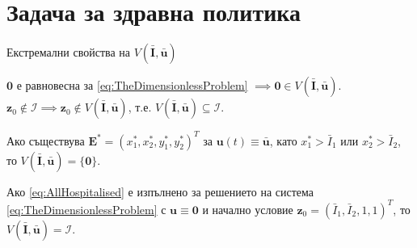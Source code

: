 \section{\hspace{1em}Задача за здравна политика}

\begin{frame}[t]{Екстремални свойства на $V(\bar{\boldsymbol{I}}, \bar{\boldsymbol{u}})$}

  $\pmb{0}$ е равновесна за \eqref{eq:TheDimensionlessProblem} $\implies \pmb{0} \in V(\bar{\boldsymbol{I}}, \bar{\boldsymbol{u}})$. \\
  $\boldsymbol{z}_0 \notin \mathcal{I} \implies \boldsymbol{z}_0 \notin V(\bar{\boldsymbol{I}}, \bar{\boldsymbol{u}})$, т.е. $V(\bar{\boldsymbol{I}}, \bar{\boldsymbol{u}}) \subseteq \mathcal{I}$.

  \begin{proposition}
    Ако съществува $\boldsymbol{E}^* = (x_1^*, x_2^*, y_1^*, y_2^*)^T$ за $\boldsymbol{u}(t) \equiv \bar{\boldsymbol{u}}$, като $x_1^* > \bar{I}_1$ или $x_2^* > \bar{I}_2$, то $V(\bar{\boldsymbol{I}}, \bar{\boldsymbol{u}}) = \{\pmb{0}\}$.
  \end{proposition}



  \begin{proposition}
    Ако \eqref{eq:AllHospitalised} е изпълнено за решението на система \eqref{eq:TheDimensionlessProblem} с $\boldsymbol{u} \equiv \pmb{0}$ и начално условие $\boldsymbol{z}_0 = (\bar{I}_1, \bar{I}_2, 1, 1)^T$, то $V(\bar{\boldsymbol{I}}, \bar{\boldsymbol{u}}) = \mathcal{I}$.
  \end{proposition}

\end{frame}

